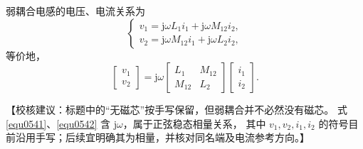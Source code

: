 \documentclass[
  12pt,
  UTF8,
  a4paper,
  fontset=fandol,
  oneside,
  openany
]{ctexrep}
\newcommand{\reviewnote}[1]{%
  \par\smallskip
  {\color{reviewgray}\small\noindent【校核建议：#1】\par}
  \smallskip
}
\begin{document}
弱耦合电感的电压、电流关系为
\begin{equation}
  \begin{cases}
    v_1=\mathrm{j}\omega L_1i_1+\mathrm{j}\omega M_{12}i_2, \\
    v_2=\mathrm{j}\omega M_{12}i_1+\mathrm{j}\omega L_2i_2,
  \end{cases}
  \label{equ0541}
\end{equation}
等价地，
\begin{equation}
  \begin{bmatrix}v_1\\v_2\end{bmatrix}
  =\mathrm{j}\omega
  \begin{bmatrix}L_1&M_{12}\\M_{12}&L_2\end{bmatrix}
  \begin{bmatrix}i_1\\i_2\end{bmatrix}.
  \label{equ0542}
\end{equation}
\reviewnote{标题中的“无磁芯”按手写保留，但弱耦合并不必然没有磁芯。
  式 \eqref{equ0541}、\eqref{equ0542} 含 $\mathrm{j}\omega$，属于正弦稳态相量关系，
  其中 $v_1,v_2,i_1,i_2$ 的符号目前沿用手写；后续宜明确其为相量，并核对同名端及电流参考方向。}
\end{document}
